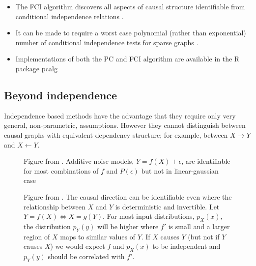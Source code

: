 \documentclass[b0,landscape,25pt]{sciposter}
\begin{document}
\begin{multicols}{5}
\begin{itemize}
\item The FCI algorithm discovers all aspects of causal structure identifiable from conditional independence relations \cite{Zhang2008}.
\item It can be made to require a worst case polynomial (rather than exponential) number of conditional independence tests for sparse graphs \cite{Claassen2013}. 
\item Implementations of both the PC and FCI algorithm are available in the R package pcalg \cite{Kalisch2012}
\end{itemize}


\subsection*{Beyond independence}
Independence based methods have the advantage that they require only very general, non-parametric, assumptions. However they cannot distinguish between causal graphs with equivalent dependency structure; for example, between $X \rightarrow Y$ and $X \leftarrow Y$.


\begin{figure}
\centering
\caption{Figure from {\cite{Hoyer2009}}. Additive noise models, $Y = f(X)+\epsilon$, are identifiable for most combinations of $f$ and $P(\epsilon)$ but not in linear-gaussian case}
{}
\end{figure}

\begin{figure}
\centering
\caption{Figure from {\cite{Daniusis2010}}. The causal direction can be identifiable even where the relationship between $X$ and $Y$ is deterministic and invertible. Let $Y = f(X) \Leftrightarrow X = g(Y)$. For most input distributions, $p_{X}(x)$, the distribution $p_{Y}(y)$ will be higher where $f'$ is small and a larger region of $X$ maps to similar values of $Y$. If $X$ causes $Y$ (but not if $Y$ causes $X$) we would expect $f$ and $p_{X}(x)$ to be independent and $p_{Y}(y)$ should be correlated with $f'$.} 


\end{figure}
\end{multicols}
\end{document}
